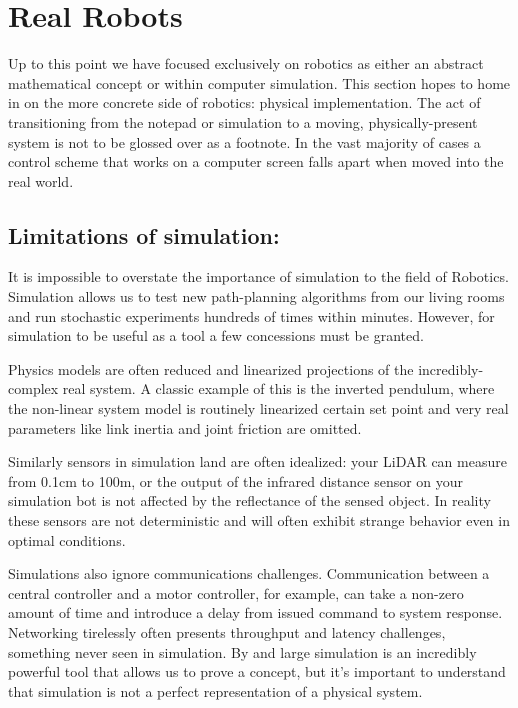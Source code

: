 \hypertarget{real-robots}{%
\section{Real Robots}\label{real-robots}}

Up to this point we have focused exclusively on robotics as either an
abstract mathematical concept or within computer simulation. This
section hopes to home in on the more concrete side of robotics: physical
implementation. The act of transitioning from the notepad or simulation
to a moving, physically-present system is not to be glossed over as a
footnote. In the vast majority of cases a control scheme that works on a
computer screen falls apart when moved into the real world.

\hypertarget{limitations-of-simulation}{%
\subsection{Limitations of
simulation:}\label{limitations-of-simulation}}

It is impossible to overstate the importance of simulation to the field
of Robotics. Simulation allows us to test new path-planning algorithms
from our living rooms and run stochastic experiments hundreds of times
within minutes. However, for simulation to be useful as a tool a few
concessions must be granted.

Physics models are often reduced and linearized projections of the
incredibly-complex real system. A classic example of this is the
inverted pendulum, where the non-linear system model is routinely
linearized certain set point and very real parameters like link inertia
and joint friction are omitted.

Similarly sensors in simulation land are often idealized: your LiDAR can
measure from 0.1cm to 100m, or the output of the infrared distance
sensor on your simulation bot is not affected by the reflectance of the
sensed object. In reality these sensors are not deterministic and will
often exhibit strange behavior even in optimal conditions.

Simulations also ignore communications challenges. Communication between
a central controller and a motor controller, for example, can take a
non-zero amount of time and introduce a delay from issued command to
system response. Networking tirelessly often presents throughput and
latency challenges, something never seen in simulation. By and large
simulation is an incredibly powerful tool that allows us to prove a
concept, but it's important to understand that simulation is not a
perfect representation of a physical system.

